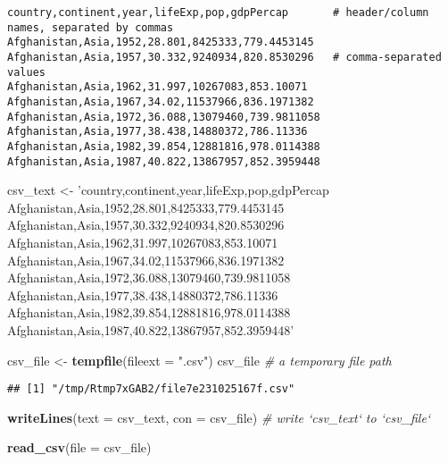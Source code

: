 \documentclass[
]{book}
\newenvironment{Shaded}{\begin{snugshade}}{\end{snugshade}}
\newcommand{\CommentTok}[1]{\textcolor[rgb]{0.56,0.35,0.01}{\textit{#1}}}
\newcommand{\DataTypeTok}[1]{\textcolor[rgb]{0.13,0.29,0.53}{#1}}
\newcommand{\KeywordTok}[1]{\textcolor[rgb]{0.13,0.29,0.53}{\textbf{#1}}}
\newcommand{\NormalTok}[1]{#1}
\newcommand{\StringTok}[1]{\textcolor[rgb]{0.31,0.60,0.02}{#1}}
\begin{document}
\begin{verbatim}
country,continent,year,lifeExp,pop,gdpPercap       # header/column names, separated by commas
Afghanistan,Asia,1952,28.801,8425333,779.4453145
Afghanistan,Asia,1957,30.332,9240934,820.8530296   # comma-separated values
Afghanistan,Asia,1962,31.997,10267083,853.10071
Afghanistan,Asia,1967,34.02,11537966,836.1971382
Afghanistan,Asia,1972,36.088,13079460,739.9811058
Afghanistan,Asia,1977,38.438,14880372,786.11336
Afghanistan,Asia,1982,39.854,12881816,978.0114388
Afghanistan,Asia,1987,40.822,13867957,852.3959448
\end{verbatim}

\begin{Shaded}
\begin{Highlighting}[]
\NormalTok{csv_text <-}\StringTok{ }
\StringTok{'country,continent,year,lifeExp,pop,gdpPercap     }
\StringTok{Afghanistan,Asia,1952,28.801,8425333,779.4453145}
\StringTok{Afghanistan,Asia,1957,30.332,9240934,820.8530296}
\StringTok{Afghanistan,Asia,1962,31.997,10267083,853.10071}
\StringTok{Afghanistan,Asia,1967,34.02,11537966,836.1971382}
\StringTok{Afghanistan,Asia,1972,36.088,13079460,739.9811058}
\StringTok{Afghanistan,Asia,1977,38.438,14880372,786.11336}
\StringTok{Afghanistan,Asia,1982,39.854,12881816,978.0114388}
\StringTok{Afghanistan,Asia,1987,40.822,13867957,852.3959448'}

\NormalTok{csv_file <-}\StringTok{ }\KeywordTok{tempfile}\NormalTok{(}\DataTypeTok{fileext =} \StringTok{".csv"}\NormalTok{)      }
\NormalTok{csv_file }\CommentTok{# a temporary file path}
\end{Highlighting}
\end{Shaded}

\begin{verbatim}
## [1] "/tmp/Rtmp7xGAB2/file7e231025167f.csv"
\end{verbatim}

\begin{Shaded}
\begin{Highlighting}[]
\KeywordTok{writeLines}\NormalTok{(}\DataTypeTok{text =}\NormalTok{ csv_text, }\DataTypeTok{con =}\NormalTok{ csv_file) }\CommentTok{# write `csv_text` to `csv_file`}
\end{Highlighting}
\end{Shaded}

\begin{Shaded}
\begin{Highlighting}[]
\KeywordTok{read_csv}\NormalTok{(}\DataTypeTok{file =}\NormalTok{ csv_file)}
\end{Highlighting}
\end{Shaded}
\end{document}
